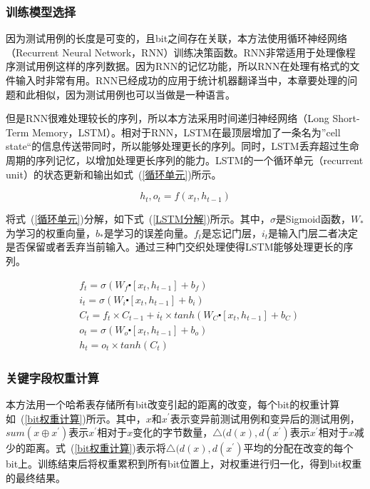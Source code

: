 \subsubsection{训练模型选择}

因为测试用例的长度是可变的，且bit之间存在关联，本方法使用循环神经网络（Recurrent Neural Network，RNN）训练决策函数。RNN非常适用于处理像程序测试用例这样的序列数据。因为RNN的记忆功能，所以RNN在处理有格式的文件输入时非常有用。RNN已经成功的应用于统计机器翻译当中，本章要处理的问题和此相似，因为测试用例也可以当做是一种语言。

但是RNN很难处理较长的序列，所以本方法采用时间递归神经网络（Long Short-Term Memory，LSTM）。相对于RNN，LSTM在最顶层增加了一条名为”cell state“的信息传送带同时，所以能够处理更长的序列。同时，LSTM丢弃超过生命周期的序列记忆，以增加处理更长序列的能力。LSTM的一个循环单元（recurrent unit）的状态更新和输出如式~(\ref{循环单元})所示。

\begin{equation}\label{循环单元}
h_{t}, o_{t} = f(x_{t},h_{t-1})
\end{equation}

将式~(\ref{循环单元})分解，如下式~(\ref{LSTM分解})所示。其中，$\sigma$是Sigmoid函数，$W_{*}$为学习的权重向量，$b_{*}$是学习的误差向量。$f_t$是忘记门层，$i_t$是输入门层二者决定是否保留或者丢弃当前输入。通过三种门交织处理使得LSTM能够处理更长的序列。

\begin{equation}\label{LSTM分解}
\begin{aligned}
& f_{t} = \sigma(W_{f} \centerdot [x_{t}, h_{t-1}] + b_f) \\
& i_t = \sigma (W_{i} \centerdot [x_{t}, h_{t-1}] + b_{i}) \\
& C_{t} = f_{t} \times C_{t-1} + i_{t} \times tanh(W_C \centerdot [x_{t}, h_{t-1}] + b_{C}) \\
& o_t = \sigma(W_{o} \centerdot [x_{t}, h_{t-1}] + b_{o}) \\
& h_{t} = o_{t} \times tanh(C_{t})
\end{aligned}
\end{equation}

\subsubsection{关键字段权重计算}
\label{关键字段权重计算}

本方法用一个哈希表存储所有bit改变引起的距离的改变，每个bit的权重计算如~(\ref{bit权重计算})所示。其中，$x$和$x^{'}$表示变异前测试用例和变异后的测试用例，$sum(x \oplus x^{'})$表示$x^{'}$相对于$x$变化的字节数量，$\bigtriangleup (d(x),d(x^{'})$表示$x^{'}$相对于$x$减少的距离。式~(\ref{bit权重计算})表示将$\bigtriangleup (d(x),d(x^{'})$平均的分配在改变的每个bit上。训练结束后将权重累积到所有bit位置上，对权重进行归一化，得到bit权重的最终结果。

